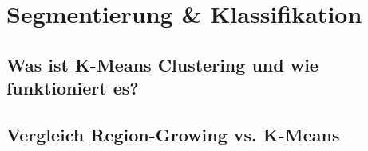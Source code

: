 \section{Segmentierung \& Klassifikation}

\subsection{Was ist K-Means Clustering und wie funktioniert es?}

\subsection{Vergleich Region-Growing vs. K-Means}
